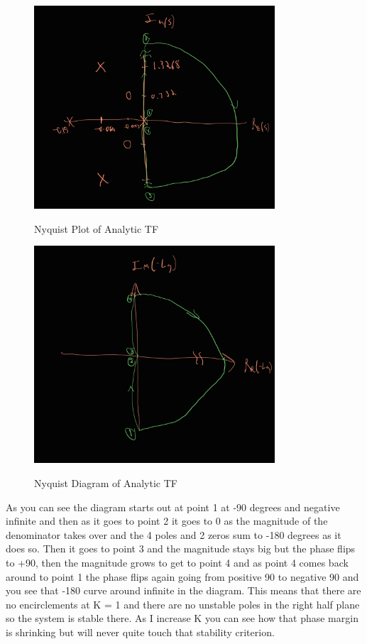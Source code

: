 \documentclass{article}
\begin{document}
\begin{figure}[H]
    \centering
    \includegraphics[width=0.8\textwidth]{nyquistPlot.jpg}
    \label{fig:nyquistPlot}
    \caption{Nyquist Plot of Analytic TF}
\end{figure}

\begin{figure}[H]
    \centering
    \includegraphics[width=0.8\textwidth]{nyquistDiagram.jpg}
    \label{fig:nyquistDiagram}
    \caption{Nyquist Diagram of Analytic TF}
\end{figure}

As you can see the diagram starts out at point 1 at -90 degrees and negative infinite and then as it goes to point 2 it goes to 0 as the magnitude of the denominator takes over and the 4 poles and 2 zeros sum to -180 degrees as it does so.
Then it goes to point 3 and the magnitude stays big but the phase flips to +90, then the magnitude grows to get to point 4 and as point 4 comes back around to point 1 the phase flips again going from positive 90 to negative 90 and you see that -180 curve around infinite in the diagram.
This means that there are no encirclements at K = 1 and there are no unstable poles in the right half plane so the system is stable there.
As I increase K you can see how that phase margin is shrinking but will never quite touch that stability criterion.
\end{document}
